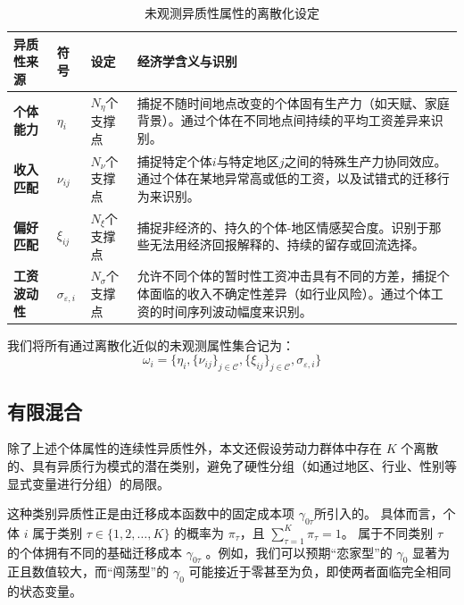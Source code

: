 \documentclass[
  a4paper,
  zihao=-4,
  fontset=mac,
  AutoFakeBold,
  AutoFakeSlant,
  oneside]{ctexbook}
\begin{document}
\begin{table}[!ht]
  \centering
  \caption{未观测异质性属性的离散化设定}
  \label{tab:unobserved_heterogeneity_setting}
  \begin{tabularx}{\textwidth}{@{}lllX@{}}
    \toprule
    \textbf{异质性来源} & \textbf{符号} & \textbf{设定} & \textbf{经济学含义与识别} \\ 
    \midrule
    \textbf{个体能力} & $\eta_i$ & $N_\eta$个支撑点 & 捕捉不随时间地点改变的个体固有生产力（如天赋、家庭背景）。通过个体在不同地点间持续的平均工资差异来识别。 \\
    \textbf{收入匹配} & $\nu_{ij}$ & $N_\nu$个支撑点 & 捕捉特定个体$i$与特定地区$j$之间的特殊生产力协同效应。通过个体在某地异常高或低的工资，以及试错式的迁移行为来识别。 \\
    \textbf{偏好匹配} & $\xi_{ij}$ & $N_\xi$个支撑点 & 捕捉非经济的、持久的个体-地区情感契合度。识别于那些无法用经济回报解释的、持续的留存或回流选择。 \\
    \textbf{工资波动性} & $\sigma_{\varepsilon,i}$ & $N_\sigma$个支撑点 & 允许不同个体的暂时性工资冲击具有不同的方差，捕捉个体面临的收入不确定性差异（如行业风险）。通过个体工资的时间序列波动幅度来识别。 \\
    \bottomrule
  \end{tabularx}
\vspace{0.5em}
\footnotesize
\end{table}

我们将所有通过离散化近似的未观测属性集合记为：
$$\omega_i = \{\eta_i, \{\nu_{ij}\}_{j \in \mathcal{C}}, \{\xi_{ij}\}_{j \in \mathcal{C}}, \sigma_{\varepsilon,i}\}$$



\subsection{有限混合}

除了上述个体属性的连续性异质性外，本文还假设劳动力群体中存在 $K$ 个离散的、具有异质行为模式的潜在类别，避免了硬性分组（如通过地区、行业、性别等显式变量进行分组）的局限。

这种类别异质性正是由迁移成本函数中的固定成本项 $\gamma_{0\tau}$所引入的。
具体而言，个体 $i$ 属于类别 $\tau \in \{1, 2, \dots, K\}$ 的概率为 $\pi_\tau$，且 $\sum\limits_{\tau=1}^K \pi_\tau = 1$。
属于不同类别 $\tau$ 的个体拥有不同的基础迁移成本 $\gamma_{0\tau}$ 。例如，我们可以预期“恋家型”的 $\gamma_0$ 显著为正且数值较大，而“闯荡型”的 $\gamma_0$ 可能接近于零甚至为负，即使两者面临完全相同的状态变量。
\end{document}
